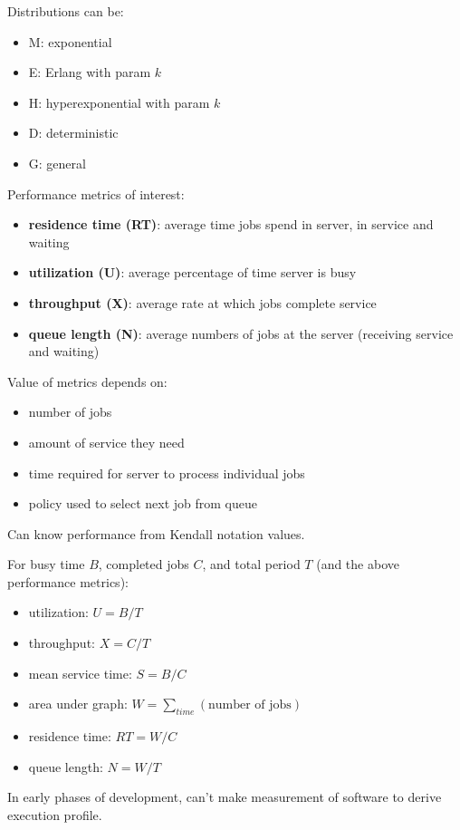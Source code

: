 \documentclass[11pt]{article}
\begin{document}
Distributions can be:
\begin{itemize}
\item M: exponential
\item E: Erlang with param \(k\)
\item H: hyperexponential with param \(k\)
\item D: deterministic
\item G: general
\end{itemize}

Performance metrics of interest:
\begin{itemize}
\item \textbf{residence time (RT)}: average time jobs spend in server, in service
and waiting
\item \textbf{utilization (U)}: average percentage of time server is busy
\item \textbf{throughput (X)}: average rate at which jobs complete service
\item \textbf{queue length (N)}: average numbers of jobs at the server (receiving
service and waiting)
\end{itemize}

Value of metrics depends on:
\begin{itemize}
\item number of jobs
\item amount of service they need
\item time required for server to process individual jobs
\item policy used to select next job from queue
\end{itemize}

Can know performance from Kendall notation values.

For busy time \(B\), completed jobs \(C\), and total period \(T\) (and the
above performance metrics):
\begin{itemize}
\item utilization: \(U = B/T\)
\item throughput: \(X = C/T\)
\item mean service time: \(S = B/C\)
\item area under graph: \(W = \sum_{time}(\text{number of jobs})\)
\item residence time: \(RT = W/C\)
\item queue length: \(N = W/T\)
\end{itemize}

In early phases of development, can't make measurement of software
to derive execution profile.
\end{document}
